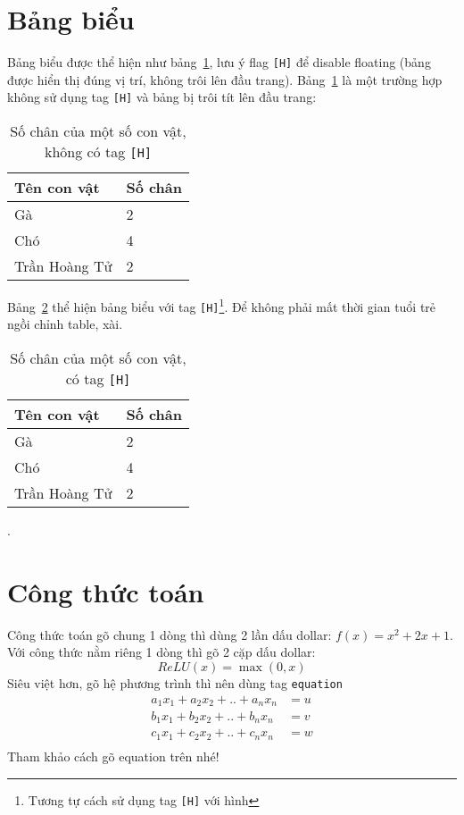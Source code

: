 \documentclass[a4paper,14pt]{article}
\begin{document}
	\section{Bảng biểu}
	Bảng biểu được thể hiện như bảng~\ref{tab:my_label}, lưu ý flag \texttt{[H]} để disable floating (bảng được hiển thị đúng vị trí, không trôi lên đầu trang). Bảng~\ref{tab:my_label} là một trường hợp không sử dụng tag \texttt{[H]} và bảng bị trôi tít lên đầu trang:
	\begin{table}%
		\centering
		\begin{tabular}{|l|l|}
			\hline
			\textbf{Tên con vật} & \textbf{Số chân} \\ \hline
			Gà & 2 \\ \hline
			Chó & 4 \\ \hline
			Trần Hoàng Tử & 2 \\ \hline
		\end{tabular}
		\caption{Số chân của một số con vật, không có tag \texttt{[H]}}
		\label{tab:my_label}
	\end{table}
	Bảng~\ref{tab:my_label_with_H_tag} thể hiện bảng biểu với tag \texttt{[H]}\footnote{Tương tự cách sử dụng tag \texttt{[H]} với hình}. Để không phải mất thời gian tuổi trẻ ngồi chỉnh table, xài.
	\begin{table}[h]
		\centering
		\begin{tabular}{|l|l|}
			\hline
			\textbf{Tên con vật} & \textbf{Số chân} \\ \hline
			Gà & 2 \\ \hline
			Chó & 4 \\ \hline
			Trần Hoàng Tử & 2 \\ \hline
		\end{tabular}
		\caption{Số chân của một số con vật, có tag \texttt{[H]}}
		\label{tab:my_label_with_H_tag}
	\end{table}.

\section{Công thức toán}
Công thức toán gõ chung 1 dòng thì dùng 2 lần dấu dollar: $f(x) = x^2 + 2x + 1$. Với công thức nằm riêng 1 dòng thì gõ 2 cặp dấu dollar:
$$
ReLU(x) = \max(0, x)
$$
Siêu việt hơn, gõ hệ phương trình thì nên dùng tag \texttt{equation}
\begin{equation*}
	\begin{aligned}
		a_1x_1 + a_2x_2 + .. + a_nx_n &= u \\
		b_1x_1 + b_2x_2 + .. + b_nx_n &= v \\
		c_1x_1 + c_2x_2 + .. + c_nx_n &= w \\
	\end{aligned}
\end{equation*}
Tham khảo cách gõ equation trên nhé!
\end{document}
